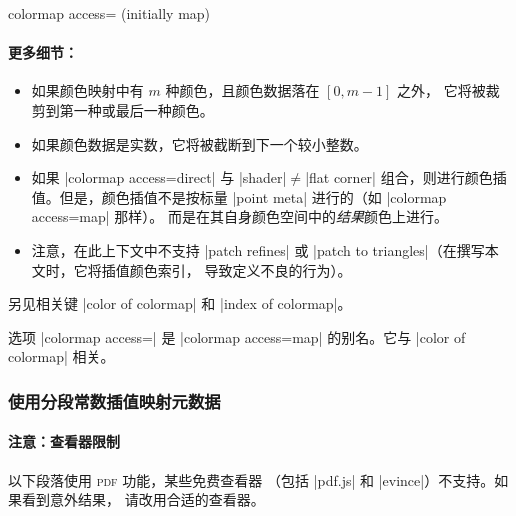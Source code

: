 \begin{pgfplotskey}{colormap access= (initially map)%
}
    \paragraph{更多细节：}

    \begin{itemize}
        \item 如果颜色映射中有 $m$ 种颜色，且颜色数据落在 $[0,m-1]$ 之外，
            它将被裁剪到第一种或最后一种颜色。
        \item 如果颜色数据是实数，它将被截断到下一个较小整数。
        \item 如果 |colormap access=direct| 与 |shader|$\neq$|flat corner|
            组合，则进行颜色插值。但是，颜色插值不是按标量
            |point meta| 进行的（如 |colormap access=map| 那样）。
            而是在其自身颜色空间中的\emph{结果}颜色上进行。
        \item 注意，在此上下文中不支持 |patch refines| 或
            |patch to triangles|（在撰写本文时，它将插值颜色索引，
            导致定义不良的行为）。
    \end{itemize}

    另见相关键 |color of colormap| 和 |index of colormap|。

    选项 |colormap access=| 是
    |colormap access=map| 的别名。它与 |color of colormap| 相关。


    \subsubsection{使用分段常数插值映射元数据}

    \paragraph{注意：查看器限制}

    以下段落使用 \textsc{pdf} 功能，某些免费查看器
    （包括 |pdf.js| 和 |evince|）不支持。如果看到意外结果，
    请改用合适的查看器。


\end{pgfplotskey}

